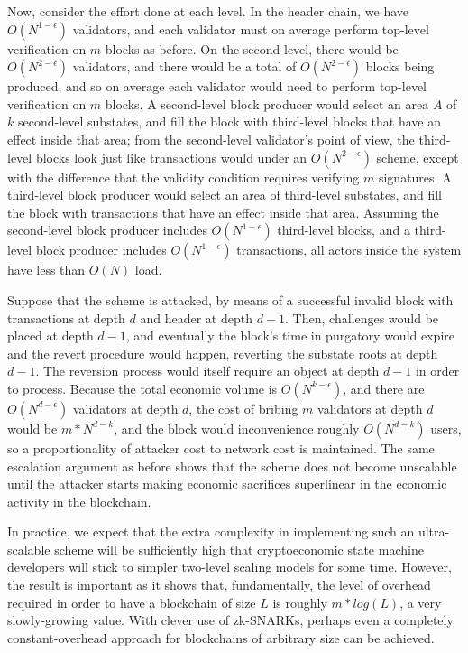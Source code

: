 \documentclass[11pt,a4paper]{report}
\theoremstyle{plain}
\theoremstyle{definition}
\theoremstyle{remark}
\begin{document}
Now, consider the effort done at each level. In the header chain, we have $O(N^{1-\epsilon})$ validators, and each validator must on average perform top-level verification on $m$ blocks as before. On the second level, there would be $O(N^{2-\epsilon})$ validators, and there would be a total of $O(N^{2-\epsilon})$ blocks being produced, and so on average each validator would need to perform top-level verification on $m$ blocks. A second-level block producer would select an area $A$ of $k$ second-level substates, and fill the block with third-level blocks that have an effect inside that area; from the second-level validator's point of view, the third-level blocks look just like transactions would under an $O(N^{2-\epsilon})$ scheme, except with the difference that the validity condition requires verifying $m$ signatures. A third-level block producer would select an area of third-level substates, and fill the block with transactions that have an effect inside that area. Assuming the second-level block producer includes $O(N^{1-\epsilon})$ third-level blocks, and a third-level block producer includes $O(N^{1-\epsilon})$ transactions, all actors inside the system have less than $O(N)$ load.

Suppose that the scheme is attacked, by means of a successful invalid block with transactions at depth $d$ and header at depth $d - 1$. Then, challenges would be placed at depth $d - 1$, and eventually the block's time in purgatory would expire and the revert procedure would happen, reverting the substate roots at depth $d - 1$. The reversion process would itself require an object at depth $d - 1$ in order to process. Because the total economic volume is $O(N^{k-\epsilon})$, and there are $O(N^{d-\epsilon})$ validators at depth $d$, the cost of bribing $m$ validators at depth $d$ would be $m * N^{d - k}$, and the block would inconvenience roughly $O(N^{d - k})$ users, so a proportionality of attacker cost to network cost is maintained. The same escalation argument as before shows that the scheme does not become unscalable until the attacker starts making economic sacrifices superlinear in the economic activity in the blockchain.

In practice, we expect that the extra complexity in implementing such an ultra-scalable scheme will be sufficiently high that cryptoeconomic state machine developers will stick to simpler two-level scaling models for some time. However, the result is important as it shows that, fundamentally, the level of overhead required in order to have a blockchain of size $L$ is roughly $m * log(L)$, a very slowly-growing value. With clever use of zk-SNARKs, perhaps even a completely constant-overhead approach for blockchains of arbitrary size can be achieved.
\end{document}
